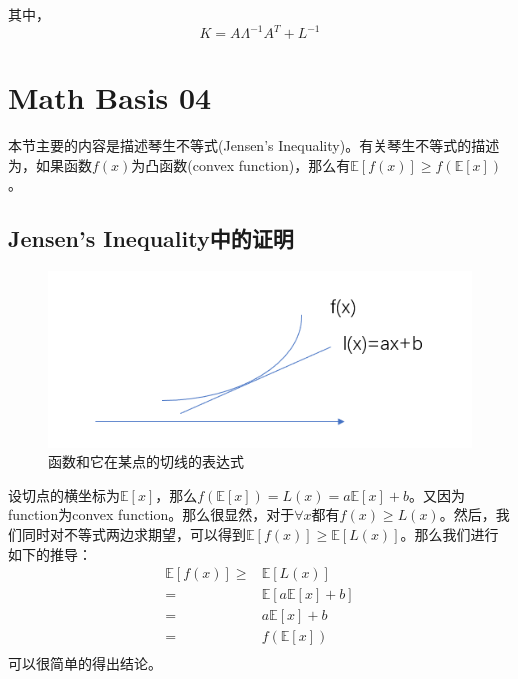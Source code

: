 \documentclass[a4paper]{article}
\numberwithin{equation}{section}
\begin{document}
其中，
\begin{equation}
    K=A\Lambda^{-1}A^T+L^{-1}
\end{equation}

\section{Math Basis 04}
本节主要的内容是描述琴生不等式(Jensen's Inequality)。有关琴生不等式的描述为，如果函数$f(x)$为凸函数(convex function)，那么有$\mathbb{E}[f(x)]\geq f(\mathbb{E}[x])$。

\subsection{Jensen's Inequality中的证明}
\begin{figure}[H]
    \centering
    \includegraphics[width=.5\textwidth]{微信图片_20191021084621.png}
    \caption{函数和它在某点的切线的表达式}
\end{figure}

设切点的横坐标为$\mathbb{E}[x]$，那么$f(\mathbb{E}[x])=L(x)=a\mathbb{E}[x]+b$。又因为function为convex function。那么很显然，对于$\forall x$都有$f(x)\geq L(x)$。然后，我们同时对不等式两边求期望，可以得到$\mathbb{E}[f(x)]\geq \mathbb{E}[L(x)]$。那么我们进行如下的推导：
\begin{equation}
    \begin{split}
        \mathbb{E}[f(x)]\geq & \mathbb{E}[L(x)] \\
        = & \mathbb{E}[a\mathbb{E}[x]+b] \\
        = & a\mathbb{E}[x] + b \\
        = & f(\mathbb{E}[x]) \\
    \end{split}
\end{equation}
可以很简单的得出结论。
\end{document}
